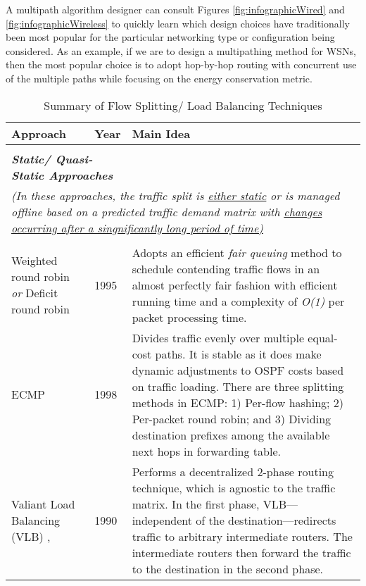 \documentclass[10pt]{IEEEtran}
\begin{document}
A multipath algorithm designer can consult Figures \ref{fig:infographicWired} and \ref{fig:infographicWireless} to quickly learn which design choices have traditionally been most popular for the particular networking type or configuration being considered. As an example, if we are to design a multipathing method for WSNs, then the most popular choice is to adopt hop-by-hop routing with concurrent use of the multiple paths while focusing on the energy conservation metric.


\begin{table*}[!ht]
\centering
\scriptsize
\ssmall
\caption{Summary of Flow Splitting/ Load Balancing Techniques}
\label{tab:LoadBalancing}
\begin{tabular}{p{2.7cm}p{1cm}p{13cm}}
\hline

\cellcolor[HTML]{EFEFEF}\textbf{Approach} & \cellcolor[HTML]{EFEFEF}\textbf{Year} & \cellcolor[HTML]{EFEFEF}\textbf{Main Idea} \\

\hline

\\

\multicolumn{2}{l}{\textbf{\textit{Static/ Quasi-Static Approaches}}}\\
\multicolumn{3}{l}{\textit{(In these approaches, the traffic split is \underline{either static} or is managed offline based on a predicted traffic demand matrix with \underline{changes occurring after a singnificantly long period of time)}}}\\

\\
Weighted round robin \textit{or} Deficit round robin \cite{shreedhar1995efficient} & 1995 & Adopts an efficient \textit{fair queuing} method to schedule contending traffic flows in an almost perfectly fair fashion with efficient running time and a complexity of \textit{O(1)} per packet processing time. \\

ECMP \cite{moy1998ospf} & 1998 & Divides traffic evenly over multiple equal-cost paths. It is stable as it does make dynamic adjustments to OSPF costs based on traffic loading. There are three splitting methods in ECMP: 1) Per-flow hashing; 2) Per-packet round robin; and 3) Dividing destination prefixes among the available next hops in forwarding table. \\



Valiant Load Balancing (VLB) \cite{zhang2010valiant}, \cite{Valiant1990} & 1990 & Performs a decentralized 2-phase routing technique, which is agnostic to the traffic matrix. In the first phase, VLB---independent of the destination---redirects traffic to arbitrary intermediate routers. The intermediate routers then forward the traffic to the destination in the second phase.  \\




\end{tabular}
\end{table*}
\end{document}
